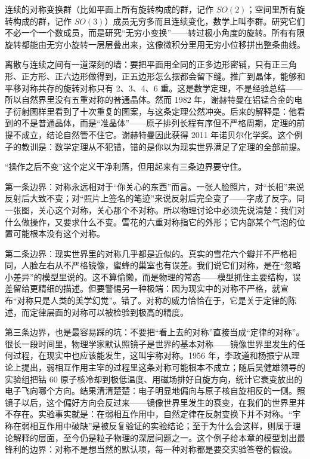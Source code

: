 \begin{challenge}
连续的对称变换群（比如平面上所有旋转构成的群，记作 \(SO(2)\)；空间里所有旋转构成的群，记作 \(SO(3)\)）成员无穷多而且连续变化，数学上叫李群。研究它们不必一个一个数成员，而是研究“无穷小变换”——转过极小角度的旋转。所有有限旋转都能由无穷小旋转一层层叠出来，这像微积分里用无穷小位移拼出整条曲线。

离散与连续之间有一道深刻的墙：要把平面用全同的正多边形密铺，只有正三角形、正方形、正六边形做得到，正五边形怎么摆都会留下缝。推广到晶体，能够和平移对称共存的旋转对称只有 2、3、4、6 重。这是数学定理，不是经验总结——所以自然界里没有五重对称的普通晶体。然而 1982 年，谢赫特曼在铝锰合金的电子衍射图样里看到了十次重复的图案，与这条定理公然冲突。后来的解释是：他看到的不是普通晶体，而是“准晶体”——原子排列长程有序但不严格周期，定理的前提不成立，结论自然管不住它。谢赫特曼因此获得 2011 年诺贝尔化学奖。这个例子的教训是：数学定理从不犯错，错的是你以为现实世界满足了定理的全部前提。
\end{challenge}


“操作之后不变”这个定义干净利落，但用起来有三条边界要守住。

第一条边界：对称永远相对于“你关心的东西”而言。一张人脸照片，对“长相”来说反射后大致不变；对“照片上签名的笔迹”来说反射后完全变了——字成了反字。同一张图，关心这个对称，关心那个不对称。所以物理讨论中必须先说清楚：我们对什么做操作，又要求什么不变。雪花的六重对称指它的外形；它内部某个气泡的位置可能根本没有这个对称。

第二条边界：现实世界里的对称几乎都是近似的。真实的雪花六个瓣并不严格相同，人脸左右从不严格镜像，蜜蜂的巢室也有误差。我们说它们对称，是在“忽略小差异”的模型里说的。这不算偷懒，而是物理的常态——模型抓住主要结构，误差留给更精细的描述。但要警惕另一种极端：因为现实中的对称不严格，就宣布“对称只是人类的美学幻觉”。错了。对称的威力恰恰在于，它是关于定律的陈述，而定律层面的对称可以被检验到极高的精度。

第三条边界，也是最容易踩的坑：不要把“看上去的对称”直接当成“定律的对称”。很长一段时间里，物理学家默认照镜子是世界的基本对称——镜像世界里发生的任何过程，在现实中也应该能发生，这叫宇称对称。1956 年，李政道和杨振宁从理论上提出，弱相互作用主宰的过程里这条对称可能根本不成立；随后吴健雄领导的实验组把钴 60 原子核冷却到极低温度、用磁场排好自旋方向，统计它衰变放出的电子飞向哪个方向。结果清清楚楚：电子明显地偏向与原子核自旋相反的一侧。照镜子以后，这个偏好方向会反过来——镜像世界里发生的衰变，在我们的世界里并不存在。实验事实就是：在弱相互作用中，自然定律在反射变换下并不对称。“宇称在弱相互作用中破缺”是被反复验证的实验结论；至于为什么会这样，则属于理论解释的层面，至今仍是粒子物理的深层问题之一。这个例子给本章的模型划出最锋利的边界：对称不是想当然的默认项，每一种对称都是要交实验答卷的假设。

